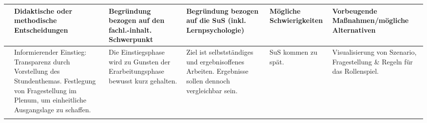 \begin{longtable}{>{\small\raggedright}lYYYYY}
\toprule
 & 
\raggedright\textbf{Didaktische oder methodische Entscheidungen} & \raggedright\textbf{Begründung bezogen auf den fachl.-inhalt. Schwerpunkt} &
	\raggedright\textbf{Begründung bezogen auf die SuS (inkl. Lernpsychologie)} & \raggedright\textbf{Mögliche Schwierigkeiten} 
	& {\raggedright\textbf{Vorbeugende Maß\-nah\-men/mögliche Alternativen}}\\
\midrule
 & 
Informierender Einstieg: Transparenz durch Vorstellung des Stundenthemas. Festlegung von Fragestellung im Plenum, um einheitliche
Ausgangslage zu schaffen. &
Die Einstiegsphase wird zu Gunsten der Erarbeitungsphase bewusst kurz gehalten. &
Ziel ist selbstständiges und ergebnisoffenes Arbeiten. Ergebnisse sollen dennoch vergleichbar sein. &
SuS kommen zu spät. \newline & 
Visualisierung von Szenario, Fragestellung \& Regeln  für das Rollenspiel.
\\ \midrule%
%
%
 & 

\end{longtable}
